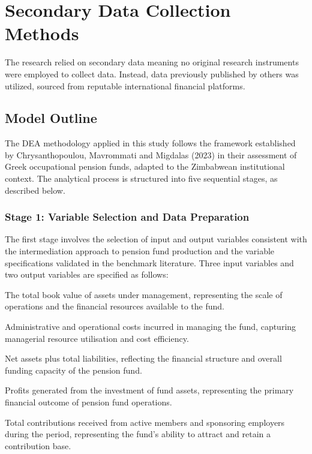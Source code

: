 \documentclass[12pt,a4paper]{article}
\begin{document}
\section{Secondary Data Collection Methods}

The research relied on secondary data meaning no original research instruments were employed to collect data. Instead, data previously published by others was utilized, sourced from reputable international financial platforms.

\subsection{Model Outline}

The DEA methodology applied in this study follows the framework established by Chrysanthopoulou, Mavrommati and Migdalas (2023) in their assessment of Greek occupational pension funds, adapted to the Zimbabwean institutional context. The analytical process is structured into five sequential stages, as described below.

\subsubsection{Stage 1: Variable Selection and Data Preparation}

The first stage involves the selection of input and output variables consistent with the intermediation approach to pension fund production and the variable specifications validated in the benchmark literature. Three input variables and two output variables are specified as follows:

\begin{description}[noitemsep]
    \item[Input 1 --- Total Assets ($x_1$):] The total book value of assets under management, representing the scale of operations and the financial resources available to the fund.
    \item[Input 2 --- Total Operating Expenses ($x_2$):] Administrative and operational costs incurred in managing the fund, capturing managerial resource utilisation and cost efficiency.
    \item[Input 3 --- Total Equity and Debt ($x_3$):] Net assets plus total liabilities, reflecting the financial structure and overall funding capacity of the pension fund.
    \item[Output 1 --- Net Investment Income ($y_1$):] Profits generated from the investment of fund assets, representing the primary financial outcome of pension fund operations.
    \item[Output 2 --- Members' Contributions ($y_2$):] Total contributions received from active members and sponsoring employers during the period, representing the fund's ability to attract and retain a contribution base.
\end{description}
\end{document}
